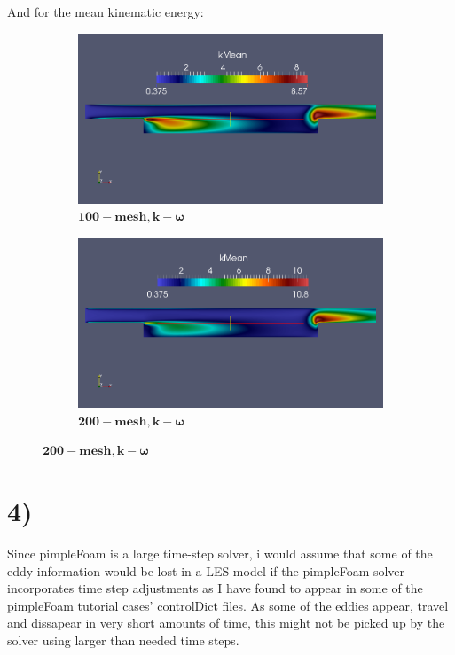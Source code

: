 \documentclass[a4paper,english,12pt,twoside]{article}
\begin{document}
\newpage
And for the mean kinematic energy:\\
\begin{figure}[h!]
	\begin{subfigure}{0.5\textwidth}
		\includegraphics[width=0.95\linewidth]{simple_ko_10_mean_k.png}
		\caption{$\mathbf{ 100-mesh, k-\omega}$}
	\end{subfigure}
	\begin{subfigure}{0.5\textwidth}
		\includegraphics[width=0.95\linewidth]{simple_ko_20_mean_k.png}
		\caption{$\mathbf{ 200-mesh, k-\omega}$}
	\end{subfigure}
\end{figure}
\section*{4)}
Since pimpleFoam is a large time-step solver, i would assume that some of the eddy information would be lost in a LES model if the pimpleFoam solver incorporates time step adjustments as I have found to appear in some of the pimpleFoam tutorial cases' controlDict files. As some of the eddies appear, travel and dissapear in very short amounts of time, this might not be picked up by the solver using larger than needed time steps.
\end{document}
